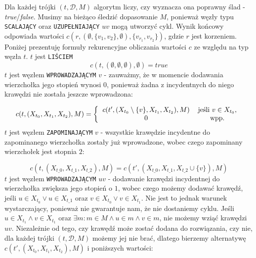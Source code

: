 \documentclass[12pt, oneside]{report}
\begin{document}
Dla każdej trójki $(t, \mathcal{D}, M)$ algorytm liczy, czy wyznacza ona poprawny ślad - \emph{true}/\emph{false}. Musimy na bieżąco śledzić dopasowanie $M$, ponieważ węzły typu \texttt{SCALAJĄCY} oraz \texttt{UZUPEŁNIAJĄCY} $uv$ mogą utworzyć cykl. Wynik końcowy odpowiada wartości $c(r, (\emptyset, \{v_1, v_2\}, \emptyset), \{v_{r_1}, v_{r_2}\})$, gdzie $r$ jest korzeniem. Poniżej prezentuję formuły rekurencyjne obliczania wartości $c$ ze względu na typ węzła $t$.
\newline\newline
$t$ jest \texttt{LIŚCIEM}
$$c(t, (\emptyset, \emptyset, \emptyset), \emptyset) = true$$
\newline
$t$ jest węzłem \texttt{WPROWADZAJĄCYM} $v$ - zauważmy, że w momencie dodawania wierzchołka jego stopień wynosi $0$, ponieważ żadna z incydentnych do niego krawędzi nie została jeszcze wprowadzona:

\[
c(t, (X_{t_0}, X_{t_1}, X_{t_2}), M) =  
\left \{
  \begin{tabular}{ccc}
  $c(t', (X_{t_0} \setminus \{v\}, X_{t_1}, X_{t_2}), M)$ & jeśli $v \in X_{t_0}$,\\
  $0$ & wpp.
  \end{tabular}
\right. 
\]
\newline
$t$ jest węzłem \texttt{ZAPOMINAJĄCYM} $v$ - wszystkie krawędzie incydentne do zapominanego wierzchołka zostały już wprowadzone, wobec czego zapominany wierzchołek jest stopnia $2$:

$$c(t, (X_{t\_0}, X_{t\_1}, X_{t\_2}), M) = c(t', (X_{t\_0}, X_{t\_1}, X_{t\_2} \cup \{v\}), M)$$
\newline
$t$ jest węzłem \texttt{WPROWADZAJĄCYM} $uv$ - dodawanie krawędzi incydentnej do wierzchołka zwiększa jego stopień o $1$, wobec czego możemy dodawać krawędź, jeśli $u \in X_{t_0} \vee u \in X_{t\_1}$ oraz $v \in X_{t_0} \vee v \in X_{t_1}$. Nie jest to jednak warunek wystarczający, ponieważ nie gwarantuje nam, że nie dostaniemy cyklu. Jeśli $u \in X_{t_1} \wedge v \in X_{t_1}$ oraz $\exists m : m \in M \wedge u \in m \wedge v \in m$, nie możemy wziąć krawędzi $uv$. Niezależnie od tego, czy krawędź może zostać dodana do rozwiązania, czy nie, dla każdej trójki $(t, \mathcal{D}, M)$ możemy jej nie brać, dlatego bierzemy alternatywę $c(t', (X_{t_0}, X_{t_1}, X_{t_2}), M)$ i poniższych wartości:
\end{document}
